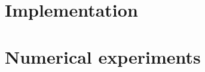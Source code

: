 \documentclass[twoside]{article}
\begin{document}


\section{Implementation}






\section{Numerical experiments}














\end{document}
